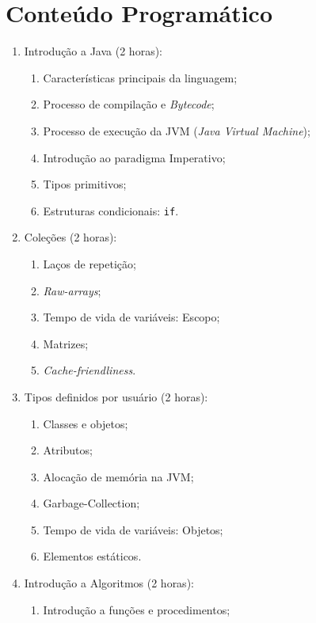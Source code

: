 \documentclass{article}
\begin{document}
\section{Conteúdo Programático}

\begin{enumerate}
    \item Introdução a Java (2 horas):
        \begin{enumerate}
            \item Características principais da linguagem;
            \item Processo de compilação e \textit{Bytecode};
            \item Processo de execução da JVM (\textit{Java Virtual Machine});
            \item Introdução ao paradigma Imperativo;
            \item Tipos primitivos;
            \item Estruturas condicionais: \texttt{if}.
        \end{enumerate}
    \item Coleções (2 horas):
        \begin{enumerate}
            \item Laços de repetição;
            \item \textit{Raw-arrays};
            \item Tempo de vida de variáveis: Escopo;
            \item Matrizes;
            \item \textit{Cache-friendliness}.
        \end{enumerate}
    \item Tipos definidos por usuário (2 horas):
        \begin{enumerate}
            \item Classes e objetos;
            \item Atributos;
            \item Alocação de memória na JVM\@;
            \item Garbage-Collection;
            \item Tempo de vida de variáveis: Objetos;
            \item Elementos estáticos.
        \end{enumerate}
    \item Introdução a Algoritmos (2 horas):
        \begin{enumerate}
            \item Introdução a funções e procedimentos;

\end{enumerate}
\end{enumerate}
\end{document}
